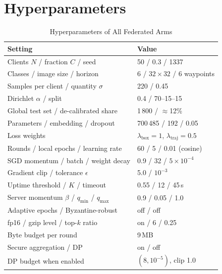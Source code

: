 \documentclass[journal]{IEEEtran}
\begin{document}
\section{Hyperparameters}\label{app:hyper}
\begin{table}[!t]
\renewcommand{\arraystretch}{1.05}
\caption{Hyperparameters of All Federated Arms}
\label{tab:hyper}
\centering
\footnotesize
\begin{tabular}{@{}ll@{}}
\toprule
Setting & Value\\
\midrule
Clients $N$ / fraction $C$ / seed & 50 / 0.3 / 1337\\
Classes / image size / horizon & 6 / $32\times32$ / 6 waypoints\\
Samples per client / quantity $\sigma$ & 220 / 0.45\\
Dirichlet $\alpha$ / split & 0.4 / 70--15--15\\
Global test set / de-calibrated share & 1\,800 / $\approx$12\%\\
Parameters / embedding / dropout & 700\,485 / 192 / 0.05\\
Loss weights & $\lambda_{\mathrm{box}}=1$, $\lambda_{\mathrm{traj}}=0.5$\\
Rounds / local epochs / learning rate & 60 / 5 / 0.01 (cosine)\\
SGD momentum / batch / weight decay & 0.9 / 32 / $5\times10^{-4}$\\
Gradient clip / tolerance $\epsilon$ & 5.0 / $10^{-3}$\\
Uptime threshold / $K$ / timeout & 0.55 / 12 / 45\,s\\
Server momentum $\beta$ / $q_{\min}$ / $q_{\max}$ & 0.9 / 0.05 / 1.0\\
Adaptive epochs / Byzantine-robust & off / off\\
fp16 / gzip level / top-$k$ ratio & on / 6 / 0.25\\
Byte budget per round & 9\,MB\\
Secure aggregation / DP & on / off\\
DP budget when enabled & $(8,10^{-5})$, clip 1.0\\
\bottomrule
\end{tabular}
\end{table}
\end{document}
